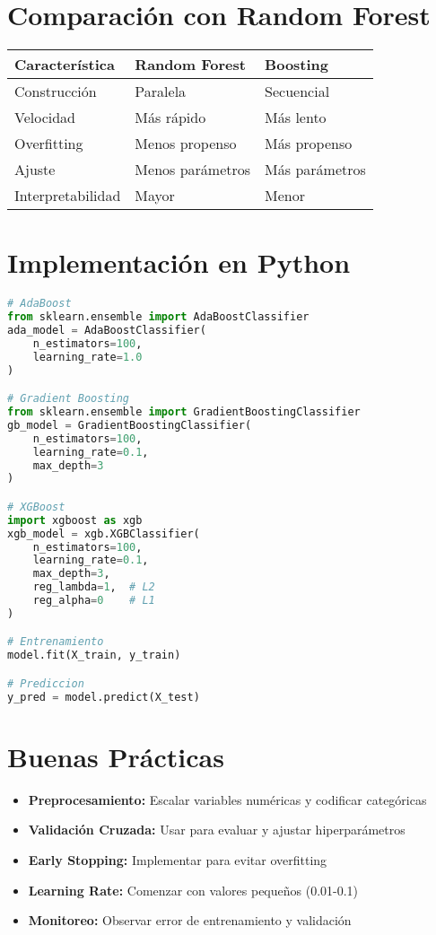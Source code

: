 \documentclass[12pt]{article}
\begin{document}
\section{Comparación con Random Forest}

\begin{table}[H]
    \centering
    \begin{tabular}{p{4cm}|p{4cm}|p{4cm}}
        \toprule
        \textbf{Característica} & \textbf{Random Forest} & \textbf{Boosting} \\
        \midrule
        Construcción & Paralela & Secuencial \\
        Velocidad & Más rápido & Más lento \\
        Overfitting & Menos propenso & Más propenso \\
        Ajuste & Menos parámetros & Más parámetros \\
        Interpretabilidad & Mayor & Menor \\
        \bottomrule
    \end{tabular}
\end{table}

\section{Implementación en Python}

\begin{lstlisting}[language=Python]
# AdaBoost
from sklearn.ensemble import AdaBoostClassifier
ada_model = AdaBoostClassifier(
    n_estimators=100,
    learning_rate=1.0
)

# Gradient Boosting
from sklearn.ensemble import GradientBoostingClassifier
gb_model = GradientBoostingClassifier(
    n_estimators=100,
    learning_rate=0.1,
    max_depth=3
)

# XGBoost
import xgboost as xgb
xgb_model = xgb.XGBClassifier(
    n_estimators=100,
    learning_rate=0.1,
    max_depth=3,
    reg_lambda=1,  # L2
    reg_alpha=0    # L1
)

# Entrenamiento
model.fit(X_train, y_train)

# Prediccion
y_pred = model.predict(X_test)
\end{lstlisting}

\section{Buenas Prácticas}
\begin{itemize}
    \item \textbf{Preprocesamiento:} Escalar variables numéricas y codificar categóricas
    \item \textbf{Validación Cruzada:} Usar para evaluar y ajustar hiperparámetros
    \item \textbf{Early Stopping:} Implementar para evitar overfitting
    \item \textbf{Learning Rate:} Comenzar con valores pequeños (0.01-0.1)
    \item \textbf{Monitoreo:} Observar error de entrenamiento y validación
\end{itemize}
\end{document}

